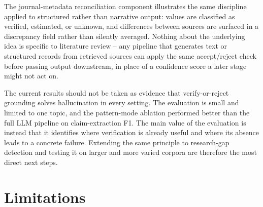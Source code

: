 \documentclass[11pt]{article}
\begin{document}
The journal-metadata reconciliation component illustrates the same discipline applied to structured rather than narrative output: values are classified as verified, estimated, or unknown, and differences between sources are surfaced in a discrepancy field rather than silently averaged. Nothing about the underlying idea is specific to literature review -- any pipeline that generates text or structured records from retrieved sources can apply the same accept/reject check before passing output downstream, in place of a confidence score a later stage might not act on.

The current results should not be taken as evidence that verify-or-reject grounding solves hallucination in every setting. The evaluation is small and limited to one topic, and the pattern-mode ablation performed better than the full LLM pipeline on claim-extraction F1. The main value of the evaluation is instead that it identifies where verification is already useful and where its absence leads to a concrete failure. Extending the same principle to research-gap detection and testing it on larger and more varied corpora are therefore the most direct next steps.

\section{Limitations}
\label{sec:limitations}
\end{document}
